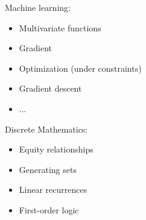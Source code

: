Machine learning:
\begin{itemize}
    \item Multivariate functions
    \item Gradient
    \item Optimization (under constraints)
    \item Gradient descent
    \item ...
\end{itemize}
Discrete Mathematics:
\begin{itemize}
    \item Equity relationships
    \item Generating sets
    \item Linear recurrences
    \item First-order logic
\end{itemize}